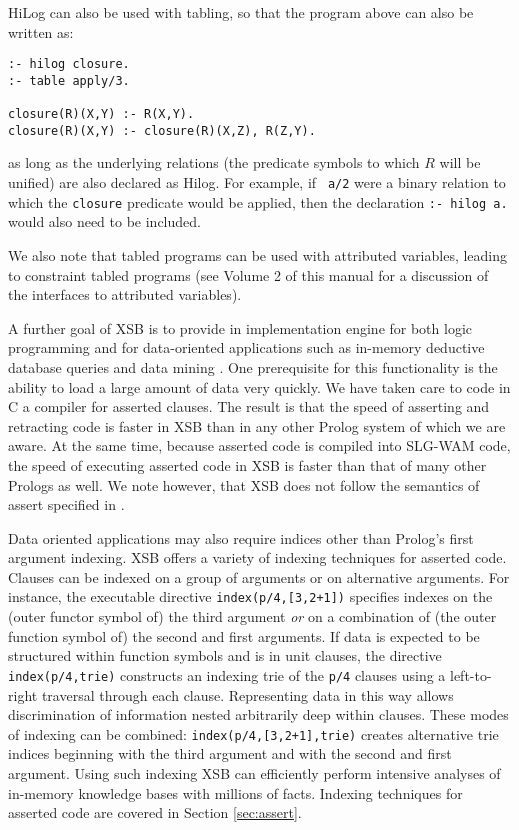 HiLog can also be used with tabling, so that the program above can also be
written as:
\begin{center}
\begin{minipage}{3.7in}
\begin{verbatim}
:- hilog closure.
:- table apply/3.

closure(R)(X,Y) :- R(X,Y).
closure(R)(X,Y) :- closure(R)(X,Z), R(Z,Y).
\end{verbatim}
\end{minipage}
\end{center}
as long as the underlying relations (the predicate symbols to which
$R$ will be unified) are also declared as Hilog.  For example, if {\tt
a/2} were a binary relation to which the {\tt closure} predicate would
be applied, then the declaration {\tt :- hilog a.} would also need to
be included.

We also note that tabled programs can be used with attributed
variables, leading to constraint tabled programs (see Volume 2 of this
manual for a discussion of the interfaces to attributed variables).

A further goal of XSB is to provide in implementation engine for both
logic programming and for data-oriented applications such as in-memory
deductive database queries and data mining \cite{SaSw94}.  One
prerequisite for this functionality is the ability to load a large
amount of data very quickly.  We have taken care to code in C a
compiler for asserted clauses.  The result is that the speed of
asserting and retracting code is faster in XSB than in any other
Prolog system of which we are aware.  At the same time, because
asserted code is compiled into SLG-WAM code, the speed of executing
asserted code in XSB is faster than that of many other Prologs as
well.  We note however, that XSB does not follow the semantics of
assert specified in \cite{LiOk87}.

Data oriented applications may also require indices other than
Prolog's first argument indexing.  XSB offers a variety of indexing
techniques for asserted code.  Clauses can be indexed on a group of
arguments or on alternative arguments.  For instance, the executable
directive {\tt index(p/4,[3,2+1])} specifies indexes on the (outer
functor symbol of) the third argument {\em or} on a combination of
(the outer function symbol of) the second and first arguments.  If
data is expected to be structured within function symbols and is in
unit clauses, the directive {\tt index(p/4,trie)} constructs an
indexing trie of the {\tt p/4} clauses using a left-to-right traversal
through each clause.  Representing data in this way allows
discrimination of information nested arbitrarily deep within clauses.
These modes of indexing can be combined: {\tt index(p/4,[3,2+1],trie)}
creates alternative trie indices beginning with the third argument and
with the second and first argument.  Using such indexing XSB can
efficiently perform intensive analyses of in-memory knowledge bases
with millions of facts.  Indexing techniques for asserted code are
covered in Section \ref{sec:assert}.


